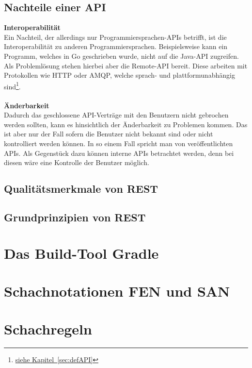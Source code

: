 \subsection{Nachteile einer \gls{API}}
\textbf{Interoperabilität}\\
Ein Nachteil, der allerdings nur Programmiersprachen-\glspl{API} betrifft, ist die Interoperabilität zu anderen Programmiersprachen. Beispielsweise kann ein Programm, welches in Go geschrieben wurde, nicht auf die Java-\gls{API} zugreifen. Als Problemlösung stehen hierbei aber die Remote-\gls{API} bereit. Diese arbeiten mit Protokollen wie \gls{HTTP} oder \gls{AMQP}, welche sprach- und plattformunabhängig sind\footnote{\hyperref[sec:defAPI]{siehe Kapitel~\ref{sec:defAPI}}}.\cite[10]{apiDesign}\\
\\
\textbf{Änderbarkeit}\\
Dadurch das geschlossene \gls{API}-Verträge mit den Benutzern nicht gebrochen werden sollten, kann es hinsichtlich der Änderbarkeit zu Problemen kommen. Das ist aber nur der Fall sofern die Benutzer nicht bekannt sind oder nicht kontrolliert werden können. In so einem Fall spricht man von veröffentlichten \glspl{API}. Als Gegenstück dazu können interne \glspl{API} betrachtet werden, denn bei diesen wäre eine Kontrolle der Benutzer möglich.

\subsection{Qualitätsmerkmale von REST}

\subsection{Grundprinzipien von REST}


\section{Das Build-Tool Gradle}

\section{Schachnotationen FEN und SAN}

\section{Schachregeln}